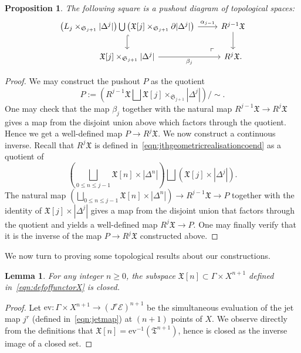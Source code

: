 \documentclass[a4paper]{amsart}
\newcommand{\cE}{\mathcal E}
\newcommand{\fX}{\mathfrak X}
\newcommand{\fT}{\mathfrak T}
\newcommand{\fS}{\mathfrak S}
\theoremstyle{plain}
\newtheorem{proposition}[theorem]{Proposition}
\newtheorem{lemma}[theorem]{Lemma}
\theoremstyle{definition}
\begin{document}
\begin{proposition}
The following square is a pushout diagram of topological spaces:
\begin{equation}\label{eqn:resolutionpushoutdiagram}
\begin{tikzcd}
{\left( L_j \times_{\fS_{j+1}} |\Delta^j|\right) \bigcup \left(\fX[j] \times_{\fS_{j+1}} \partial |\Delta^j|\right) } \arrow[d, hook] \arrow[r, "\alpha_{j-1}"] \arrow[dr, phantom, "\ulcorner", very near end] & R^{j-1}\fX \arrow[d] \\
{\fX[j] \times_{\fS_{j+1}} |\Delta^j|} \arrow[r, "\beta_j"']                                                                        & R^j\fX.             
\end{tikzcd}
\end{equation}
\end{proposition}
\begin{proof}
We may construct the pushout $P$ as the quotient
\[
    P := \left( R^{j-1}\fX \bigsqcup \fX[j] \times_{\fS_{j+1}} |\Delta^j| \right) / \sim.
\]
One may check that the map $\beta_j$ together with the natural map $R^{j-1}\fX \to R^j\fX$ gives a map from the disjoint union above which factors through the quotient. Hence we get a well-defined map $P \to R^j\fX$. We now construct a continuous inverse. Recall that $R^j\fX$ is defined in~\eqref{eqn:jthgeometricrealisationcoend} as a quotient of
\[
    \left( \bigsqcup_{0 \leq n \leq j-1} \fX[n] \times |\Delta^n| \right) \bigsqcup \left( \fX[j] \times |\Delta^j| \right).
\]
The natural map $\left( \bigsqcup_{0 \leq n \leq j-1} \fX[n] \times |\Delta^n| \right) \to R^{j-1}\fX \to P$ together with the identity of $\fX[j] \times |\Delta^j|$ gives a map from the disjoint union that factors through the quotient and yields a well-defined map $R^j\fX \to P$. One may finally verify that it is the inverse of the map $P \to R^j\fX$ constructed above.
\end{proof}


We now turn to proving some topological results about our constructions.
\begin{lemma}\label{lemma:Xnisclosed}
For any integer $n \geq 0$, the subspace $\fX[n] \subset \Gamma \times X^{n+1}$ defined in~\eqref{eqn:defoffunctorX} is closed.
\end{lemma}
\begin{proof}
Let $\mathrm{ev} \colon \Gamma \times X^{n+1} \to (J^r\cE)^{n+1}$ be the simultaneous evaluation of the jet map $j^r$ (defined in~\eqref{eqn:jetmap}) at $(n+1)$ points of $X$. We observe directly from the definitions that $\fX[n] = \mathrm{ev}^{-1}(\fT^{n+1})$, hence is closed as the inverse image of a closed set.
\end{proof}
\end{document}
